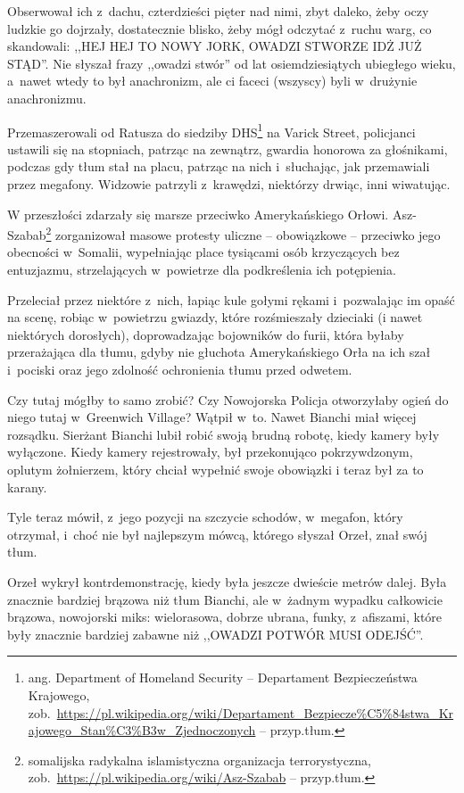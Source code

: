 \documentclass[oneside,polish,11pt,sfheadings]{mwbk}
\begin{document}
Obserwował ich z~dachu, czterdzieści pięter nad nimi, zbyt daleko, żeby
oczy ludzkie go dojrzały, dostatecznie blisko, żeby mógł odczytać z~ruchu warg, co skandowali: ,,HEJ HEJ TO NOWY JORK, OWADZI STWORZE IDŻ
JUŻ STĄD''. Nie słyszał frazy ,,owadzi stwór'' od lat osiemdziesiątych
ubiegłego wieku, a~nawet wtedy to był anachronizm, ale ci faceci
(wszyscy) byli w~drużynie anachronizmu.

Przemaszerowali od Ratusza do siedziby DHS\footnote{ ang. Department of
Homeland Security -- Departament Bezpieczeństwa Krajowego,
zob.~\url{https://pl.wikipedia.org/wiki/Departament\_Bezpiecze\%C5\%84stwa\_Krajowego\_Stan\%C3\%B3w\_Zjednoczonych}
-- przyp.tłum.} na Varick Street, policjanci ustawili się na stopniach,
patrząc na zewnątrz, gwardia honorowa za głośnikami, podczas gdy tłum
stał na placu, patrząc na nich i~słuchając, jak przemawiali przez
megafony. Widzowie patrzyli z~krawędzi, niektórzy drwiąc, inni
wiwatując.

W przeszłości zdarzały się marsze przeciwko Amerykańskiego Orłowi.
Asz-Szabab\footnote{ somalijska radykalna islamistyczna organizacja
terrorystyczna,
zob.~\url{https://pl.wikipedia.org/wiki/Asz-Szabab} -- przyp.tłum.} zorganizował masowe protesty uliczne -- obowiązkowe -- przeciwko jego obecności w~Somalii, wypełniając place tysiącami osób
krzyczących bez entuzjazmu, strzelających w~powietrze dla podkreślenia
ich potępienia.

Przeleciał przez niektóre z~nich, łapiąc kule gołymi rękami i~pozwalając
im opaść na scenę, robiąc w~powietrzu gwiazdy, które rozśmieszały
dzieciaki (i nawet niektórych dorosłych), doprowadzając bojowników do
furii, która byłaby przerażająca dla tłumu, gdyby nie głuchota
Amerykańskiego Orła na ich szał i~pociski oraz jego zdolność ochronienia
tłumu przed odwetem.

Czy tutaj mógłby to samo zrobić? Czy Nowojorska Policja otworzyłaby
ogień do niego tutaj w~Greenwich Village? Wątpił w~to. Nawet Bianchi
miał więcej rozsądku. Sierżant Bianchi lubił robić swoją brudną robotę,
kiedy kamery były wyłączone. Kiedy kamery rejestrowały, był przekonująco
pokrzywdzonym, oplutym żołnierzem, który chciał wypełnić swoje obowiązki
i teraz był za to karany.

Tyle teraz mówił, z~jego pozycji na szczycie schodów, w~megafon, który
otrzymał, i~choć nie był najlepszym mówcą, którego słyszał Orzeł, znał
swój tłum.

Orzeł wykrył kontrdemonstrację, kiedy była jeszcze dwieście metrów
dalej. Była znacznie bardziej brązowa niż tłum Bianchi, ale w~żadnym
wypadku całkowicie brązowa, nowojorski miks: wielorasowa, dobrze ubrana,
funky, z~afiszami, które były znacznie bardziej zabawne niż ,,OWADZI
POTWÓR MUSI ODEJŚĆ''.
\end{document}
